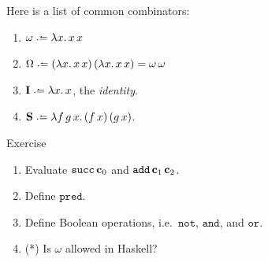 \begin{frame}
  Here is a list of common combinators:
\begin{enumerate}
  \item $\omega \defeq \lambda x.\, x\,x$
  \item $\Omega \defeq (\lambda x.\, x\,x)\,(\lambda x.\,x\,x)
    = \omega\,\omega$
  \item $\mathbf{I} \defeq \lambda x.\, x$, the \emph{identity}.
  \item $\mathbf{S}\defeq\lambda f\,g\,x.\, 
    (f\,x)\,(g\,x)$.
\end{enumerate}
  \begin{block}{Exercise}
    \begin{enumerate}
      \item Evaluate $\mathtt{succ}\,\mathbf{c}_0$ and $\mathtt{add}\,\mathbf{c}_{1}\,\mathbf{c}_{2}$. 
      \item Define $\mathtt{pred}$. 
      \item Define Boolean operations, i.e.\ $\mathtt{not}$, $\mathtt{and}$,
        and $\mathtt{or}$. 
      \item (*) Is $\omega$ allowed in Haskell? 
    \end{enumerate}
  \end{block}
\end{frame}

